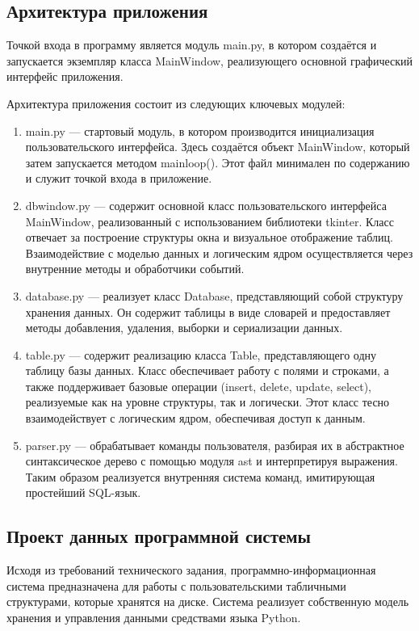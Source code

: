 \subsection{Архитектура приложения}

Точкой входа в программу является модуль main.py, в котором создаётся и запускается экземпляр класса MainWindow, реализующего основной графический интерфейс приложения.

Архитектура приложения состоит из следующих ключевых модулей:
\begin{enumerate}
	\item main.py — стартовый модуль, в котором производится инициализация пользовательского интерфейса. Здесь создаётся объект MainWindow, который затем запускается методом mainloop(). Этот файл минимален по содержанию и служит точкой входа в приложение.
	\item dbwindow.py — содержит основной класс пользовательского интерфейса MainWindow, реализованный с использованием библиотеки tkinter. Класс отвечает за построение структуры окна и визуальное отображение таблиц. Взаимодействие с моделью данных и логическим ядром осуществляется через внутренние методы и обработчики событий.
	\item database.py — реализует класс Database, представляющий собой структуру хранения данных. Он содержит таблицы в виде словарей и предоставляет методы добавления, удаления, выборки и сериализации данных.
	\item table.py — содержит реализацию класса Table, представляющего одну таблицу базы данных. Класс обеспечивает работу с полями и строками, а также поддерживает базовые операции (insert, delete, update, select), реализуемые как на уровне структуры, так и логически. Этот класс тесно взаимодействует с логическим ядром, обеспечивая доступ к данным.
	\item parser.py —  обрабатывает команды пользователя, разбирая их в абстрактное синтаксическое дерево с помощью модуля ast и интерпретируя выражения. Таким образом реализуется внутренняя система команд, имитирующая простейший SQL-язык.
\end{enumerate}

\subsection{Проект данных программной системы}

Исходя из требований технического задания, программно-информационная система предназначена для работы с пользовательскими табличными структурами, которые хранятся на диске. Система реализует собственную модель хранения и управления данными средствами языка Python.

